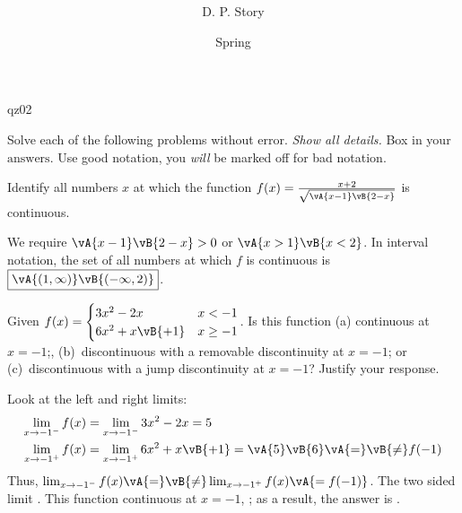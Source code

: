 \documentclass{article}
\title[\sExam]{\bfseries\Exam}
\author{D. P. Story}
\date{Spring \the\year}
\begin{document}
\maketitle

\begin{exam}{qz02}

\begin{instructions}
Solve each of the following problems without error. \textit{Show all details.} Box in your
$\boxed{\text{answers.}}$ Use good notation, you \emph{will} be marked off for bad notation.
\end{instructions}

\begin{problem}[3]
Identify all numbers $x$ at which the function $ f(x) = \frac{x+2}{\sqrt{\vA{x-1}\vB{2-x}}} $ is continuous.

\begin{solution}[.75in]
We require $ \vA{x - 1}\vB{2-x} >0 $ or $ \vA{x > 1}\vB{x<2} $. In
interval notation, the set of all numbers at which $f$ is continuous is
$\boxed{\vA{( 1, \infty )}\vB{(-\infty, 2)} }$.
\end{solution}
\end{problem}

\begin{problem}[3]
Given  $ f(x) = \begin{cases}
    3x^2 - 2x           & x < -1 \\
    6x^2  + x \vB{+1}   & x \ge -1
\end{cases}$. Is this function (a) continuous at $ x = -1 $;, (b)~discontinuous with a removable discontinuity
at $ x = -1 $; or (c)~discontinuous with a jump discontinuity at $ x = -1 $?  Justify your response.

\begin{solution}[2in]
Look at the left and right limits:
\begin{align*}
    \lim_{x\to-1^-}f(x) &= \lim_{x\to-1^-} 3x^2 - 2x = 5\\
    \lim_{x\to-1^+}f(x) &= \lim_{x\to-1^+}  6x^2  + x \vB{+1} = \vA{5}\vB{6} \vA{=}\vB{\neq} f(-1)
\end{align*}
Thus, $\lim_{x\to-1^-}f(x) \vA{=}\vB{\neq}
\lim_{x\to-1^+}f(x)\vA{=f(-1)}$. The two sided limit . This function  continuous at $x=-1$, ; as a result, the answer
is .
\end{solution}
\end{problem}


\end{exam}
\end{document}

